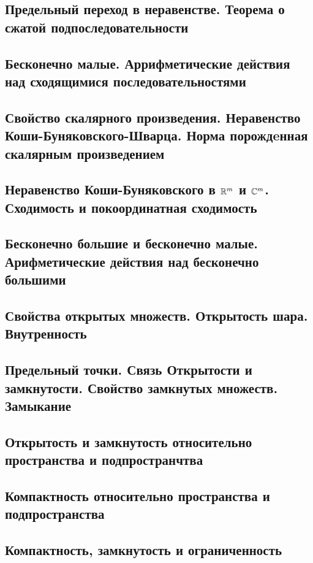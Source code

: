 \subsection{Предельный переход в неравенстве. Теорема о сжатой подпоследовательности}

\skip
\subsection{Бесконечно малые. Аррифметические действия над сходящимися последовательностями}

\skip
\subsection{Свойство скалярного произведения. Неравенство Коши-Буняковского-Шварца. Норма порождeнная скалярным произведением}

\skip
\subsection{Неравенство Коши-Буняковского в $\mathbb{R}^m$ и $\mathbb{C}^m$. Сходимость и покоординатная сходимость}

\skip
\subsection{Бесконечно большие и бесконечно малые. Арифметические действия над бесконечно большими}

\skip
\subsection{Свойства открытых множеств. Открытость шара. Внутренность}

\skip
\subsection{Предельный точки. Связь Открытости и замкнутости. Свойство замкнутых множеств. Замыкание}

\skip
\subsection{Открытость и замкнутость относительно пространства и подпространчтва}

\skip
\subsection{Компактность относительно пространства и подпространства}

\skip
\subsection{Компактность, замкнутость и ограниченность}

\skip

